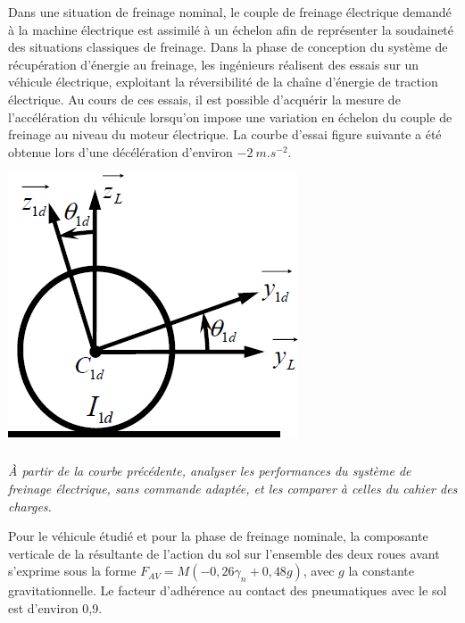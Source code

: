 \documentclass[10pt,fleqn]{article} %
\begin{document}
\begin{multicols}{2}
Dans une situation de freinage nominal, le couple de freinage électrique demandé à la machine électrique est
assimilé à un échelon afin de représenter la soudaineté des situations classiques de freinage.
Dans la phase de conception du système de récupération d’énergie au freinage, les ingénieurs réalisent des essais
sur un véhicule électrique, exploitant la réversibilité de la chaîne d’énergie de traction électrique. Au cours de
ces essais, il est possible d’acquérir la mesure de l’accélération du véhicule lorsqu’on impose une variation en
échelon du couple de freinage au niveau du moteur électrique. La courbe d’essai figure suivante a été obtenue lors
d’une décélération d’environ $\SI{-2}{m.s^{-2}}$.



\begin{center}
\includegraphics[width=\linewidth]{images/fig_03}

\end{center}

\subparagraph{}\textit{À partir de la courbe précédente, analyser les performances du système de freinage électrique, sans
commande adaptée, et les comparer à celles du cahier des charges.}
\ifprof
\begin{corrige}
\end{corrige}
\else
\fi

Pour le véhicule étudié et pour la phase de freinage nominale, la composante verticale de la résultante de
l’action du sol sur l’ensemble des deux roues avant s’exprime sous la forme $F_{AV} = M(-0,26\gamma_n + 0,48g)$, avec $g$ la constante gravitationnelle. Le facteur d’adhérence au contact des pneumatiques avec le sol est d’environ 0,9.


\end{multicols}
\end{document}
